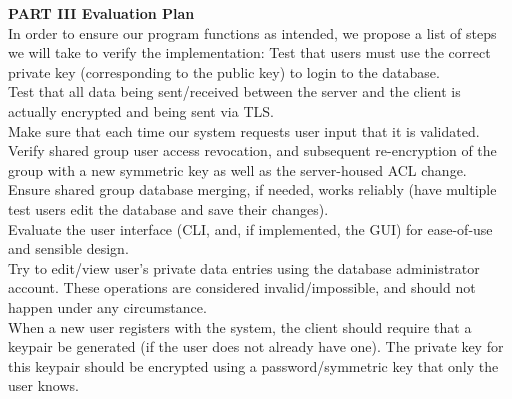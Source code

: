 \documentclass[11pt, letterpaper]{article}
\newcommand{\DesignSection}[1]
{\noindent\textbf{#1}\\}
\newcommand{\IndentBullet}[1]
{\indent\textbullet{} #1\\}
\begin{document}
\bigskip
\DesignSection{PART III Evaluation Plan}
\noindent
In order to ensure our program functions as intended, we propose a list of steps we will take to verify the implementation:
\IndentBullet{Test that users must use the correct private key (corresponding to the public key) to login to the database.}
\IndentBullet{Test that all data being sent/received between the server and the client is actually encrypted and being sent via TLS.}
\IndentBullet{Make sure that each time our system requests user input that it is validated.}
\IndentBullet{Verify shared group user access revocation, and subsequent re-encryption of the group with a new symmetric key as well as the server-housed ACL change.}
\IndentBullet{Ensure shared group database merging, if needed, works reliably (have multiple test users edit the database and save their changes).}
\IndentBullet{Evaluate the user interface (CLI, and, if implemented, the GUI) for ease-of-use and sensible design.}
\IndentBullet{Try to edit/view user’s private data  entries using the database administrator account. These operations are considered invalid/impossible, and should not happen under any circumstance.}
\IndentBullet{When a new user registers with the system, the client should require that a keypair be generated (if the user does not already have one). The private key for this keypair should be encrypted using a password/symmetric key that only the user knows.}
\end{document}
